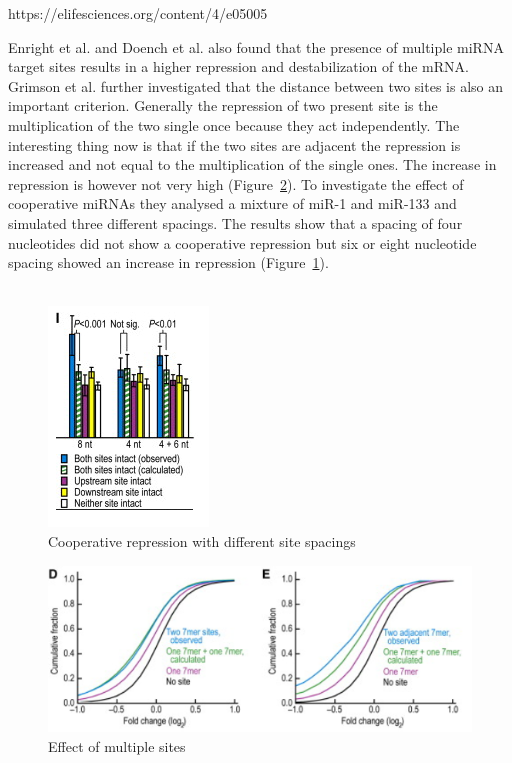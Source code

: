 \documentclass[12pt]{article}
\begin{document}
https://elifesciences.org/content/4/e05005

Enright et al. \cite{Enright} and Doench et al. \cite{Doench} also found that the presence of multiple miRNA target sites results in a higher repression and destabilization of the mRNA. Grimson et al. \cite{Grimson} further investigated that the distance between two sites is also an important criterion. Generally the repression of two present site is the multiplication of the two single once because they act independently. The interesting thing now is that if the two sites are adjacent the repression is increased and not equal to the multiplication of the single ones. The increase in repression is however not very high (Figure~\ref{sitedistance}). To investigate the effect of cooperative miRNAs they analysed a mixture of miR-1 and miR-133 and simulated three different spacings. The results show that a spacing of four nucleotides did not show a cooperative repression but six or eight nucleotide spacing showed an increase in repression (Figure~\ref{sitespacing}).\\\\

\begin{figure}[h]
\centering
\includegraphics[scale=1]{results/sites_8nt.PNG}  
\caption{Cooperative repression with different site spacings}
\label{sitespacing}
\end{figure}

\begin{figure}[h]
\centering
\includegraphics[scale=0.7]{results/sites_distance.PNG}
\caption{Effect of multiple sites}
\label{sitedistance}
\end{figure}
\end{document}
